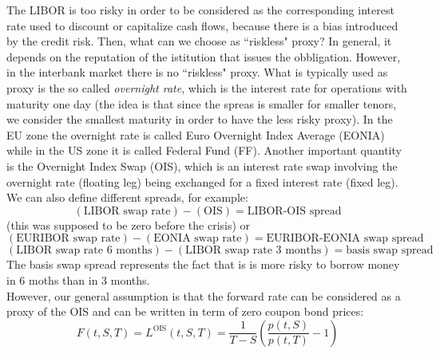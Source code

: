 The LIBOR is too risky in order to be considered as the corresponding interest rate used to discount or capitalize cash flows, because there is a bias introduced by the credit risk. Then, what can we choose as ``riskless" proxy? In general, it depends on the reputation of the istitution that issues the obbligation. However, in the interbank market there is no ``riskless" proxy. What is typically used as proxy is the so called \emph{overnight rate}, which is the interest rate for operations with maturity one day (the idea is that since the spreas is smaller for smaller tenors, we consider the smallest maturity in order to have the less risky proxy). In the EU zone the overnight rate is called Euro Overnight Index Average (EONIA) while in the US zone it is called Federal Fund (FF). Another important quantity is the Overnight Index Swap (OIS), which is an interest rate swap involving the overnight rate (floating leg) being exchanged for a fixed interest rate (fixed leg). \\ %
We can also define different spreads, for example:
\begin{equation*}
    (\text{LIBOR swap rate}) - (\text{OIS}) = \text{LIBOR-OIS spread}
\end{equation*}
(this was supposed to be zero before the crisis) or
\begin{equation*}
    (\text{EURIBOR swap rate}) - (\text{EONIA swap rate}) = \text{EURIBOR-EONIA swap spread}
\end{equation*}
\begin{equation*}
    (\text{LIBOR swap rate 6 months}) - (\text{LIBOR swap rate 3 months}) = \text{basis swap spread}
\end{equation*}
The basis swap spread represents the fact that is is more risky to borrow money in 6 moths than in 3 months.\\
However, our general assumption is that the forward rate can be considered as a proxy of the OIS and can be written in term of zero coupon bond prices:
\begin{equation}
    F(t,S,T) = L^{\text{OIS}}(t,S,T) = \frac{1}{T-S}\left(\frac{p(t,S)}{p(t,T)}-1\right)
\end{equation}
